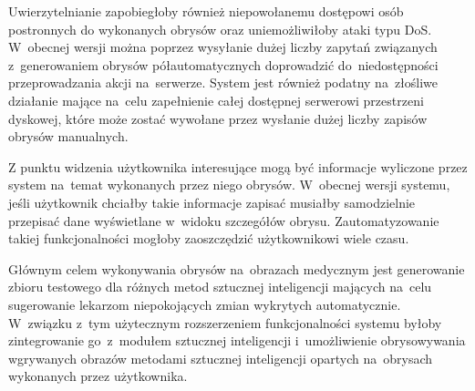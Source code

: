 \documentclass[a4paper,11pt,twoside,openright]{report}
\theoremstyle{definition}
\begin{document}
Uwierzytelnianie zapobiegłoby również niepowołanemu dostępowi osób postronnych
do wykonanych obrysów oraz uniemożliwiłoby ataki typu DoS. W~obecnej wersji można
poprzez wysyłanie dużej liczby zapytań związanych z~generowaniem obrysów półautomatycznych
doprowadzić do~niedostępności przeprowadzania akcji na~serwerze. System jest również
podatny na~złośliwe działanie mające na~celu zapełnienie całej dostępnej serwerowi
przestrzeni dyskowej, które może zostać wywołane przez wysłanie dużej liczby
zapisów obrysów manualnych.

Z punktu widzenia użytkownika interesujące mogą być informacje wyliczone przez
system na~temat wykonanych przez niego obrysów. W~obecnej wersji systemu, jeśli
użytkownik chciałby takie informacje zapisać musiałby samodzielnie przepisać dane
wyświetlane w~widoku szczegółów obrysu. Zautomatyzowanie takiej funkcjonalności
mogłoby zaoszczędzić użytkownikowi wiele czasu.

Głównym celem wykonywania obrysów na~obrazach medycznym jest generowanie zbioru
testowego dla różnych metod sztucznej inteligencji mających na~celu sugerowanie
lekarzom niepokojących zmian wykrytych automatycznie. W~związku z~tym użytecznym
rozszerzeniem funkcjonalności systemu byłoby zintegrowanie go~z~modułem sztucznej
inteligencji i~umożliwienie obrysowywania wgrywanych obrazów metodami sztucznej
inteligencji opartych na~obrysach wykonanych przez użytkownika.




\end{document}
